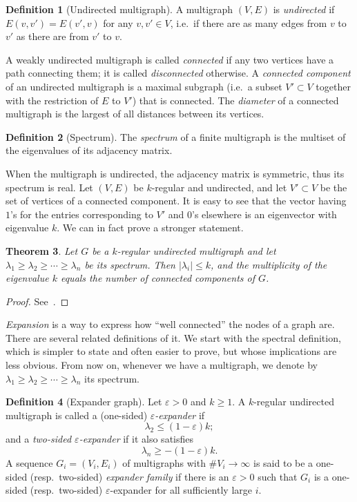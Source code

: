 \documentclass[10pt]{article}
\theoremstyle{plain}
\newtheorem{theorem}{Theorem}
\theoremstyle{definition}
\newtheorem{definition}[theorem]{Definition}
\begin{document}
\begin{definition}[Undirected multigraph]
  A multigraph $(V,E)$ is \emph{undirected} if $E(v,v') = E(v',v)$ for
  any $v,v'∈V$, i.e.\ if there are as many edges from $v$ to $v'$ as
  there are from $v'$ to $v$.
\end{definition}

A weakly undirected multigraph is called \emph{connected} if any two
vertices have a path connecting them; it is called \emph{disconnected}
otherwise. %
A \emph{connected component} of an undirected multigraph is a maximal
subgraph (i.e.\ a subset $V'⊂V$ together with the restriction of $E$
to $V'$) that is connected. %
The \emph{diameter} of a connected multigraph is the largest of all
distances between its vertices. %

\begin{definition}[Spectrum]
  The \emph{spectrum} of a finite multigraph is the multiset of the
  eigenvalues of its adjacency matrix.
\end{definition}

When the multigraph is undirected, the adjacency matrix is symmetric,
thus its spectrum is real. %
Let $(V,E)$ be $k$-regular and undirected, and let $V'⊂V$ be the set
of vertices of a connected component. %
It is easy to see that the vector having $1$'s for the entries
corresponding to $V'$ and $0$'s elsewhere is an eigenvector with
eigenvalue $k$. %
We can in fact prove a stronger statement.

\begin{theorem}
  Let $G$ be a $k$-regular undirected multigraph and let
  $λ_1 ≥ λ_2 ≥ \cdots ≥ λ_n$ be its spectrum. %
  Then $|λ_i| ≤ k$, and the multiplicity of the eigenvalue $k$ equals
  the number of connected components of $G$.
\end{theorem}
\begin{proof}
  See~\cite[Chap.~3]{trevisan-graphs}.
\end{proof}

\emph{Expansion} is a way to express how ``well connected'' the nodes
of a graph are. %
There are several related definitions of it. %
We start with the spectral definition, which is simpler to state and
often easier to prove, but whose implications are less obvious. %
From now on, whenever we have a multigraph, we denote by
$λ_1 ≥ λ_2 ≥ \cdots ≥ λ_n$ its spectrum.

\begin{definition}[Expander graph]
  Let $ε>0$ and $k≥1$. %
  A $k$-regular undirected multigraph is called a (one-sided)
  \emph{$ε$-expander} if
  \[λ_2≤(1-ε)k;\]
  and a \emph{two-sided $ε$-expander} if it also satisfies
  \[λ_n≥-(1-ε)k.\] %
  A sequence $G_i=(V_i,E_i)$ of multigraphs with $\#V_i→∞$ is said to
  be a one-sided (resp.\ two-sided) \emph{expander family} if there is
  an $ε>0$ such that $G_i$ is a one-sided (resp.\ two-sided)
  $ε$-expander for all sufficiently large $i$.
\end{definition}
\end{document}
